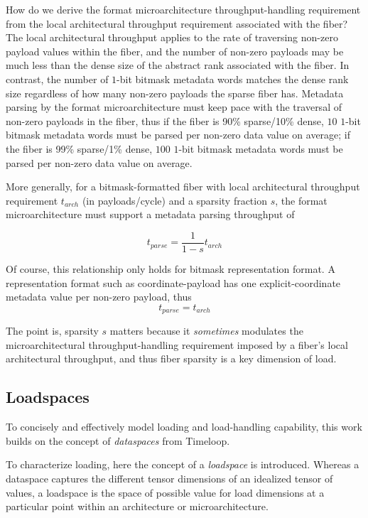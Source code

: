 \begin{itemize}
    How do we derive the format microarchitecture throughput-handling requirement from the local architectural throughput requirement associated with the fiber? The local architectural throughput applies to the rate of traversing non-zero payload values within the fiber, and the number of non-zero payloads may be much less than the dense size of the abstract rank associated with the fiber. In contrast, the number of $1$-bit bitmask metadata words matches the dense rank size regardless of how many non-zero payloads the sparse fiber has. Metadata parsing by the format microarchitecture must keep pace with the traversal of non-zero payloads in the fiber, thus if the fiber is 90\% sparse/10\% dense, $10$ $1$-bit bitmask metadata words must be parsed per non-zero data value on average; if the fiber is 99\% sparse/1\% dense, $100$ $1$-bit bitmask metadata words must be parsed per non-zero data value on average.

    More generally, for a bitmask-formatted fiber with local architectural throughput requirement $t_{arch}$ (in payloads/cycle) and a sparsity fraction $s$, the format microarchitecture must support a metadata parsing throughput of

    \[t_{parse} = \frac{1}{1-s}t_{arch}\]

    Of course, this relationship only holds for bitmask representation format. A representation format such as coordinate-payload has one explicit-coordinate metadata value per non-zero payload, thus \[t_{parse} = t_{arch}\]

    The point is, sparsity $s$ matters because it \textit{sometimes} modulates the microarchitectural throughput-handling requirement imposed by a fiber's local architectural throughput, and thus fiber sparsity is a key dimension of load.

\subsection{Loadspaces}

To concisely and effectively model loading and load-handling capability, this work builds on the concept of \textit{dataspaces} from Timeloop\cite{timeloop}.

To characterize loading, here the concept of a \textit{loadspace} is introduced. Whereas a dataspace captures the different tensor dimensions of an idealized tensor of values, a loadspace is the space of possible value for load dimensions at a particular point within an architecture or microarchitecture.


\end{itemize}
